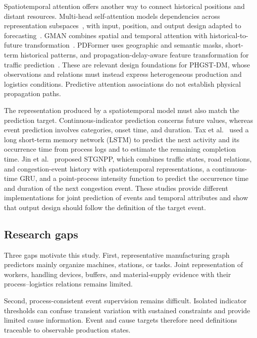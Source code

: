 \documentclass[a4paper,fleqn]{cas-dc}
\begin{document}
Spatiotemporal attention offers another way to connect historical positions and distant resources. Multi-head self-attention models dependencies across representation subspaces~\cite{vaswani2017attention}, with input, position, and output design adapted to forecasting~\cite{wen2023transformers}. GMAN combines spatial and temporal attention with historical-to-future transformation~\cite{zheng2020gman}. PDFormer uses geographic and semantic masks, short-term historical patterns, and propagation-delay-aware feature transformation for traffic prediction~\cite{jiang2023pdformer}. These are relevant design foundations for PHGST-DM, whose observations and relations must instead express heterogeneous production and logistics conditions. Predictive attention associations do not establish physical propagation paths.

The representation produced by a spatiotemporal model must also match the prediction target. Continuous-indicator prediction concerns future values, whereas event prediction involves categories, onset time, and duration. Tax et al.~\cite{tax2017predictive} used a long short-term memory network (LSTM) to predict the next activity and its occurrence time from process logs and to estimate the remaining completion time. Jin et al.~\cite{jin2023stgnpp} proposed STGNPP, which combines traffic states, road relations, and congestion-event history with spatiotemporal representations, a continuous-time GRU, and a point-process intensity function to predict the occurrence time and duration of the next congestion event. These studies provide different implementations for joint prediction of events and temporal attributes and show that output design should follow the definition of the target event.



\subsection{Research gaps}

Three gaps motivate this study. First, representative manufacturing graph predictors mainly organize machines, stations, or tasks. Joint representation of workers, handling devices, buffers, and material-supply evidence with their process--logistics relations remains limited.

Second, process-consistent event supervision remains difficult. Isolated indicator thresholds can confuse transient variation with sustained constraints and provide limited cause information. Event and cause targets therefore need definitions traceable to observable production states.
\end{document}
